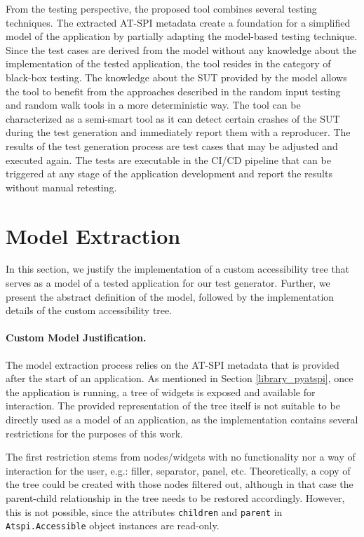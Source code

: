 From the testing perspective, the proposed tool combines several testing techniques. The extracted AT-SPI metadata create a foundation for a simplified model of the application by partially adapting the model-based testing technique. Since the test cases are derived from the model without any knowledge about the implementation of the tested application, the tool resides in the category of black-box testing. The knowledge about the SUT provided by the model allows the tool to benefit from the approaches described in the random input testing and random walk tools in a more deterministic way. The tool can be characterized as a semi-smart tool as it can detect certain crashes of the SUT during the test generation and immediately report them with a reproducer. The results of the test generation process are test cases that may be adjusted and executed again. The tests are executable in the CI/CD pipeline that can be triggered at any stage of the application development and report the results without manual retesting.

\section{Model Extraction}\label{model}
 In this section, we justify the implementation of a custom accessibility tree that serves as a model of a tested application for our test generator. Further, we present the abstract definition of the model, followed by the implementation details of the custom accessibility tree.
 
\paragraph{Custom Model Justification.} The model extraction process relies on the AT-SPI metadata that is provided after the start of an application. As mentioned in Section \ref{library_pyatspi}, once the application is running, a tree of widgets is exposed and available for interaction. The provided representation of the tree itself is not suitable to be directly used as a model of an application, as the implementation contains several restrictions for the purposes of this work.

The first restriction stems from nodes/widgets with no functionality nor a way of interaction for the user, e.g.: filler, separator, panel, etc. Theoretically, a copy of the tree could be created with those nodes filtered out, although in that case the parent-child relationship in the tree needs to be restored accordingly. However, this is not possible, since the attributes \texttt{children} and \texttt{parent} in \texttt{Atspi.Accessible} object instances are read-only. 

